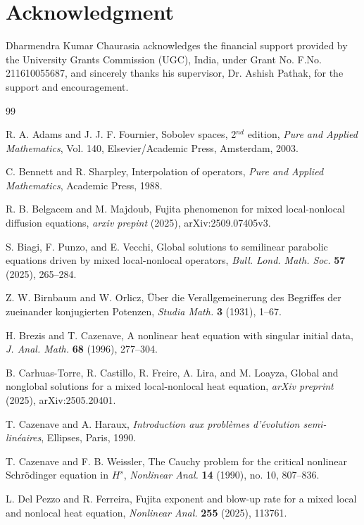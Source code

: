 \documentclass[a4paper,11pt]{amsart}
\numberwithin{equation}{section}
\theoremstyle{plain}
\theoremstyle{definition}
\begin{document}
 
\section*{Acknowledgment}

Dharmendra Kumar Chaurasia acknowledges the financial support provided by the University Grants Commission (UGC), India, under Grant No. F.No. 211610055687, and sincerely thanks his supervisor, Dr. Ashish Pathak, for the support and encouragement.

\begin{thebibliography}{99}

R. A. Adams and J. J. F. Fournier,
{Sobolev spaces},
2$^{nd}$ edition, \emph{Pure and Applied Mathematics}, Vol. 140, Elsevier/Academic Press, Amsterdam, 2003.

C. Bennett and R. Sharpley,
{Interpolation of operators},
\emph{Pure and Applied Mathematics}, Academic Press, 1988.

R. B. Belgacem and M. Majdoub,
Fujita phenomenon for mixed local-nonlocal diffusion equations, \emph{arxiv prepint} (2025),
arXiv:2509.07405v3.

S. Biagi, F. Punzo, and E. Vecchi,
Global solutions to semilinear parabolic equations driven by mixed local-nonlocal operators,
\emph{Bull. Lond. Math. Soc.} {\bf57} (2025), 265--284.

Z. W. Birnbaum and W. Orlicz,
\"Uber die Verallgemeinerung des Begriffes der zueinander konjugierten Potenzen,
\emph{Studia Math.} {\bf 3} (1931), 1--67.

H. Brezis and T. Cazenave,
A nonlinear heat equation with singular initial data,
\emph{J. Anal. Math.} \textbf{68} (1996), 277--304.

B. Carhuas-Torre, R. Castillo, R. Freire, A. Lira, and M. Loayza,
Global and nonglobal solutions for a mixed local-nonlocal heat equation,
\emph{arXiv preprint} (2025), arXiv:2505.20401.

T. Cazenave and A. Haraux,
\emph{Introduction aux probl\`emes d'\'evolution semi-lin\'eaires},
Ellipses, Paris, 1990.

T. Cazenave and F. B. Weissler,
The Cauchy problem for the critical nonlinear Schr\"odinger equation in $H^s$,
\emph{Nonlinear Anal.} \textbf{14} (1990), no. 10, 807--836.

L. Del Pezzo and R. Ferreira,
Fujita exponent and blow-up rate for a mixed local and nonlocal heat equation,
\emph{Nonlinear Anal.} \textbf{255} (2025), 113761.


\end{thebibliography}
\end{document}
